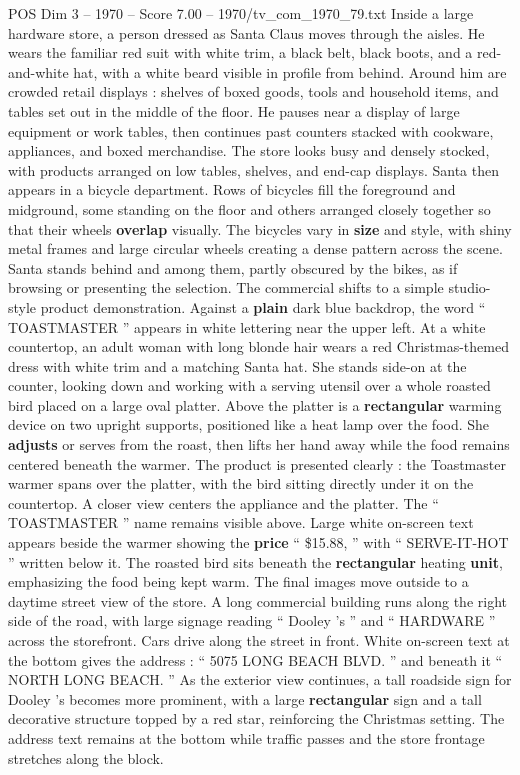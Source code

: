 \begin{textsample}{POS Dim 3 – 1970 – Score 7.00 – 1970/tv\_com\_1970\_79.txt}  \label{ex:f3_pos_037}
Inside a large hardware store, a person dressed as Santa Claus moves through the aisles.
He wears the familiar red suit with white trim, a black belt, black boots, and a red-and-white hat, with a white beard visible in profile from behind.
Around him are crowded retail displays : shelves of boxed goods, tools and household items, and tables set out in the middle of the floor.
He pauses near a display of large equipment or work tables, then continues past counters stacked with cookware, appliances, and boxed merchandise.
The store looks busy and densely stocked, with products arranged on low tables, shelves, and end-cap displays.
Santa then appears in a bicycle department.
Rows of bicycles fill the foreground and midground, some standing on the floor and others arranged closely together so that their wheels \textbf{overlap} visually.
The bicycles vary in \textbf{size} and style, with shiny metal frames and large circular wheels creating a dense pattern across the scene.
Santa stands behind and among them, partly obscured by the bikes, as if browsing or presenting the selection.
The commercial shifts to a simple studio-style product demonstration.
Against a \textbf{plain} dark blue backdrop, the word “ TOASTMASTER ” appears in white lettering near the upper left.
At a white countertop, an adult woman with long blonde hair wears a red Christmas-themed dress with white trim and a matching Santa hat.
She stands side-on at the counter, looking down and working with a serving utensil over a whole roasted bird placed on a large oval platter.
Above the platter is a \textbf{rectangular} warming device on two upright supports, positioned like a heat lamp over the food.
She \textbf{adjusts} or serves from the roast, then lifts her hand away while the food remains centered beneath the warmer.
The product is presented clearly : the Toastmaster warmer spans over the platter, with the bird sitting directly under it on the countertop.
A closer view centers the appliance and the platter.
The “ TOASTMASTER ” name remains visible above.
Large white on-screen text appears beside the warmer showing the \textbf{price} “ \$15.88, ” with “ SERVE-IT-HOT ” written below it.
The roasted bird sits beneath the \textbf{rectangular} heating \textbf{unit}, emphasizing the food being kept warm.
The final images move outside to a daytime street view of the store.
A long commercial building runs along the right side of the road, with large signage reading “ Dooley ’s ” and “ HARDWARE ” across the storefront.
Cars drive along the street in front.
White on-screen text at the bottom gives the address : “ 5075 LONG BEACH BLVD. ” and beneath it “ NORTH LONG BEACH. ” As the exterior view continues, a tall roadside sign for Dooley ’s becomes more prominent, with a large \textbf{rectangular} sign and a tall decorative structure topped by a red star, reinforcing the Christmas setting.
The address text remains at the bottom while traffic passes and the store frontage stretches along the block.

\end{textsample}
